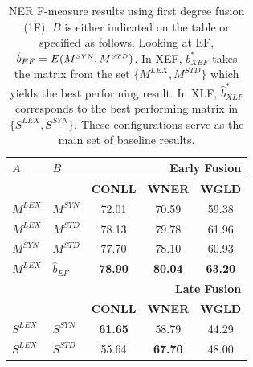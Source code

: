 \begin{table}[!tb]
\centering
\setlength\tabcolsep{2pt}

\caption{NER F-measure results using first degree fusion (1F). $B$ is either indicated on the table or specified as follows. Looking at EF,  $\hat{b}_{EF} = E(M^{\scriptscriptstyle SYN}, M^{\scriptscriptstyle STD})$. In XEF, ${b}^*_{\scriptscriptstyle XEF}$ takes the matrix from the set $\{M^{\scriptscriptstyle LEX}, M^{\scriptscriptstyle STD} \}$ which yields the best performing result. In XLF, $\hat{b}_{\scriptscriptstyle XLF}^{*}$ corresponds to the best performing matrix in $\{S^{\scriptscriptstyle LEX},S^{\scriptscriptstyle SYN}\}$. These configurations serve as the main set of baseline results.}
\label{tab:ner-1d}
\centering
\begin{tabular}{@{}llccc@{}}
\toprule
    $A$      &    $B$       & \multicolumn{3}{r}{\textbf{Early Fusion} }                                            \\ \midrule
          &           & \textbf{CONLL}                      & \textbf{WNER}                      & \textbf{WGLD}                      \\ \cmidrule{3-5}
$M^{\scriptscriptstyle LEX}$ & $M^{\scriptscriptstyle SYN}$ & 72.01                      & 70.59                     & 59.38                     \\
$M^{\scriptscriptstyle LEX}$ & $M^{\scriptscriptstyle STD}$ & 78.13                      & 79.78                     & 61.96                     \\
$M^{\scriptscriptstyle SYN}$ & $M^{\scriptscriptstyle STD}$ & 77.70                      & 78.10                     & 60.93                     \\
$M^{\scriptscriptstyle LEX}$ & $\hat{b}_{EF}$ & \textbf{78.90}                      & \textbf{80.04}                     & \textbf{63.20}                   \\
\midrule
          &           & \multicolumn{3}{r}{\textbf{Late Fusion} }                                             \\
\midrule     
          &           & \textbf{CONLL}                      & \textbf{WNER}                      & \textbf{WGLD}                      \\ \cmidrule{3-5}
$S^{\scriptscriptstyle LEX}$ & $S^{\scriptscriptstyle SYN}$ & \textbf{61.65}                      & 58.79                     & 44.29                     \\
$S^{\scriptscriptstyle LEX}$ & $S^{\scriptscriptstyle STD}$ & 55.64                      & \textbf{67.70}                     & 48.00                     \\

\end{tabular}
\end{table}

